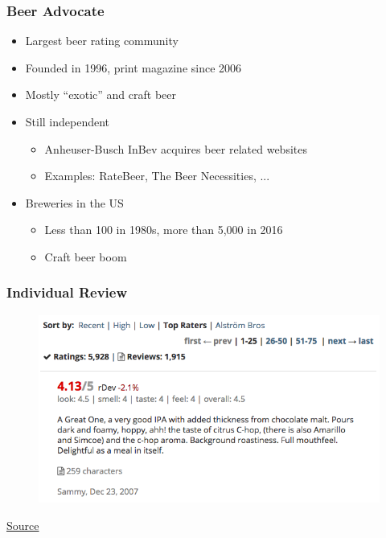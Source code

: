 \begin{frame}
    \frametitle{Beer Advocate}
\begin{itemize}
    \item Largest beer rating community
    \item Founded in 1996, print magazine since 2006
    \item Mostly ``exotic'' and craft beer
    \item Still independent
    \begin{itemize}
        \item Anheuser-Busch InBev acquires beer related websites
        \item Examples: RateBeer, The Beer Necessities, ...
    \end{itemize}
    \item Breweries in the US
    \begin{itemize}
        \item Less than 100 in 1980s, more than 5,000 in 2016
        \item Craft beer boom 
    \end{itemize}
\end{itemize}
\end{frame}

\begin{frame}
    \frametitle{Individual Review}
    \vspace{-25pt}
    \begin{figure}[htb]
        \begin{center}
            \includegraphics[scale=0.5]{img/figures/rating}
        \end{center}

\end{figure}
\vspace{-20pt}
\begin{flushright}
\textcolor{iseblue}{\href{https://www.beeradvocate.com/beer/profile/147/38470/?view=beer&sort=topr&start=0}{Source}}
\end{flushright}
\end{frame}

